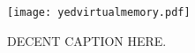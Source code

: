 
\begin{figure}
\centering

\texttt{[image: yedvirtualmemory.pdf]}

\caption{DECENT CAPTION HERE.}
\label{fig:virtualmemory}

\end{figure}